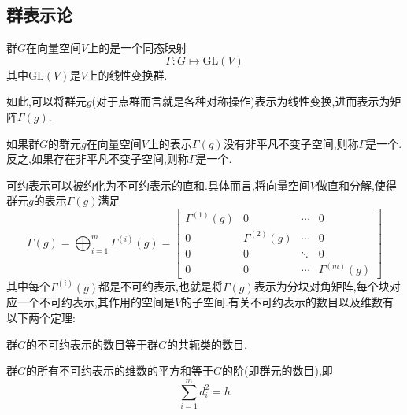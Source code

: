 \documentclass{ctexbook}
\begin{document}
\subsection{群表示论}
\begin{definition}[群表示]
    群$G$在向量空间$V$上的是一个同态映射
    \[\Gamma:G\mapsto\text{GL}(V)\]
    其中$\text{GL}(V)$是$V$上的线性变换群.
\end{definition}
如此,可以将群元$g$(对于点群而言就是各种对称操作)表示为线性变换,进而表示为矩阵$\Gamma(g)$.
\begin{definition}[可约表示与不可约表示]
    如果群$G$的群元$g$在向量空间$V$上的表示$\Gamma(g)$没有非平凡不变子空间,则称$\Gamma$是一个.反之,如果存在非平凡不变子空间,则称$\Gamma$是一个.
\end{definition}
可约表示可以被约化为不可约表示的直和.具体而言,将向量空间$V$做直和分解,使得群元$g$的表示$\Gamma(g)$满足
\[\Gamma(g)=\bigoplus_{i=1}^{m}\Gamma^{(i)}(g)=\begin{bmatrix}
\Gamma^{(1)}(g) & 0 & \cdots & 0\\
0 & \Gamma^{(2)}(g) & \cdots & 0\\
0 & 0 & \ddots & 0\\
0 & 0 & \cdots & \Gamma^{(m)}(g)
\end{bmatrix}\]
其中每个$\Gamma^{(i)}(g)$都是不可约表示,也就是将$\Gamma(g)$表示为分块对角矩阵,每个块对应一个不可约表示,其作用的空间是$V$的子空间.有关不可约表示的数目以及维数有以下两个定理:
\begin{theorem}[不可约表示的数目]
    群$G$的不可约表示的数目等于群$G$的共轭类的数目.
\end{theorem}
\begin{theorem}[不可约表示的维数]
    群$G$的所有不可约表示的维数的平方和等于$G$的阶(即群元的数目),即
    \[\sum_{i=1}^{m}d_i^2=h\]
\end{theorem}
\end{document}
